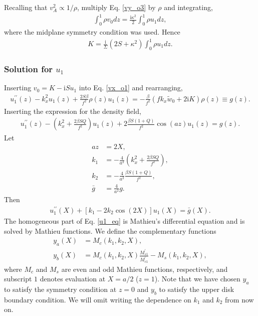 \documentclass[12pt,preprint]{aastex}
\newcommand{\imgi}{\mathrm{i}}
\begin{document}
Recalling that $v_A^2\propto 1/\rho$, multiply Eq. \ref{vy_o3} by
$\rho$ and integrating,
\begin{align}
  \int_0^1\rho v_0 dz = \frac{\imgi\kappa^2}{2} \int_0^1\rho u_1 dz, 
\end{align} 
where the midplane symmetry condition was used. Hence
\begin{align}
  K = \frac{\imgi}{\Sigma}\left(2S + \kappa^2\right)\int_0^1\rho u_1
  dz. \label{K_def}
\end{align}

\subsubsection{Solution for $u_1$} 
Inserting $v_0 = K - \imgi S u_1$ into Eq. \ref{vx_o1} and
rearranging, 
\begin{align}
  u_1^{\prime\prime}(z) - k_x^2u_1(z) +
  \frac{2S\beta}{f^2}\rho(z)u_1(z) =
  -\frac{\beta}{f^2}\left(fk_x\tilde{w}_0 + 2\imgi K\right)\rho(z)\equiv
  g(z).  
\end{align}
Inserting the expression for the density field,
\begin{align}
  u_1^{\prime\prime}(z) - \left( k_x^2 + \frac{2\beta S
    Q}{f^2}\right)u_1(z) + 2\frac{\beta S(1+Q)}{f^2}\cos{(az)}
  u_1(z) = g(z). 
\end{align}
Let
\begin{align}
  az &= 2X,\\
  k_1 & =  -\frac{4}{a^2}\left( k_x^2 + \frac{2\beta S
    Q}{f^2}\right),\\
  k_2 & = -\frac{4}{a^2}\frac{\beta S(1+Q)}{f^2},\\
  \bar{g} &= \frac{4}{a^2} g.
\end{align}
Then
\begin{align}
  u_1^{\prime\prime}(X) + \left[k_1 - 2k_2\cos{\left(2X\right)} \right]u_1(X) =
  \bar{g}(X). \label{u1_eq} 
\end{align}
The homogeneous part of Eq. \ref{u1_eq} is Mathieu's differential
equation and is solved by Mathieu functions. We define the
complementary functions
\begin{align}
  y_a(X) &= M_c(k_1, k_2, X),\\
  y_b(X) &= M_c(k_1, k_2, X)\frac{M_{s1}^\prime}{M_{c1}^\prime} -
  M_s(k_1, k_2, X),  
\end{align}
where $M_c$ and $M_s$ are even and odd Mathieu functions,
respectively, and subscript $1$ denotes evaluation at $X=a/2$
($z=1$). Note that we have chosen $y_a$ to satisfy the symmetry
condition at $z=0$ and $y_b$ to satisfy the upper disk boundary
condition. We will omit writing the dependence on $k_1$ and $k_2$ from
now on. 
\end{document}
